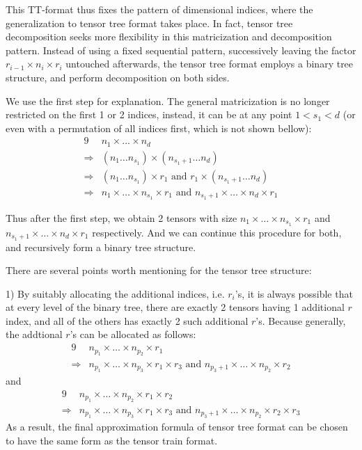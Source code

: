 \documentclass[12pt]{article}
\begin{document}
This TT-format thus fixes the pattern of dimensional indices, where the generalization to tensor tree format takes place. In fact, tensor tree decomposition seeks more flexibility in this matricization and decomposition pattern. Instead of using a fixed sequential pattern, successively leaving the factor $r_{i-1} \times n_i \times r_i$ untouched afterwards, the tensor tree format employs a binary tree structure, and perform decomposition on both sides.

We use the first step for explanation. The general matricization is no longer restricted on the first 1 or 2 indices, instead, it can be at any point $1 < s_1 < d$ (or even with a permutation of all indices first, which is not shown bellow):
\begin{alignat*}{9}
&n_1 \times \dots \times n_d \\
\Rightarrow &  (n_1 \dots n_{s_1}) \times (n_{s_1+1} \dots n_d) \\
\Rightarrow & (n_1 \dots n_{s_1}) \times r_1 \text{ and } r_1 \times (n_{s_1+1} \dots n_d) \\
\Rightarrow & n_1 \times  \dots \times n_{s_1} \times r_1 \text{ and } n_{s_1+1} \times \dots \times n_d \times r_1
\end{alignat*}

Thus after the first step, we obtain 2 tensors with size $n_1 \times  \dots \times n_{s_1} \times r_1$ and $ n_{s_1+1} \times \dots \times n_d \times r_1$ respectively. And we can continue this procedure for both, and recursively form a binary tree structure.

There are several points worth mentioning for the tensor tree structure:

1) By suitably allocating the additional indices, i.e. $r_i$'s, it is always possible that at every level of the binary tree, there are exactly 2 tensors having 1 additional $r$ index, and all of the others has exactly 2 such additional $r$'s. Because generally, the addtional $r$'s can be allocated as follows:
\begin{alignat*}{9}
& n_{p_1} \times \dots \times n_{p_2} \times r_1 \\
\Rightarrow & n_{p_1} \times \dots \times n_{p_3} \times r_1 \times r_3 \text{ and } n_{p_3+1} \times \dots \times n_{p_2} \times r_2
\end{alignat*}
and
\begin{alignat*}{9}
& n_{p_1} \times \dots \times n_{p_2} \times r_1 \times r_2\\
\Rightarrow & n_{p_1} \times \dots \times n_{p_3} \times r_1 \times r_3 \text{ and } n_{p_3+1} \times \dots \times n_{p_2} \times r_2 \times r_3
\end{alignat*}
As a result, the final approximation formula of tensor tree format can be chosen to have the same form as the tensor train format.
\end{document}

